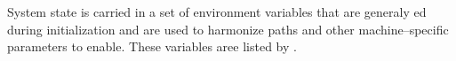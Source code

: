 System state is carried in a set of environment variables that are generaly ed during initialization and are used to harmonize paths and other machine--specific parameters to enable. These variables aree listed by .